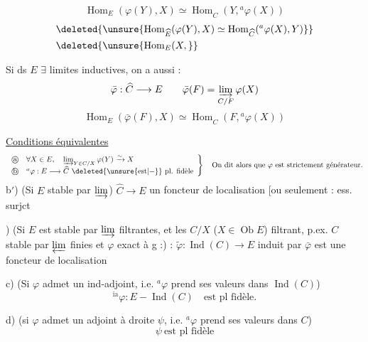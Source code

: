 \[
 \operatorname{Hom}_E(\varphi(Y),X)\simeq\operatorname{Hom}_{\widehat C}(Y,{}^a\varphi(X))
\]
\[
 \begin{aligned}
 &\deleted{\unsure{\operatorname{Hom}_{\widehat E}(\varphi(Y),X)\simeq\operatorname{Hom}_{\widehat C}({}^a\varphi(X),Y)}}\\
 &\deleted{\unsure{\operatorname{Hom}_E(X,}}
 \end{aligned}
\]

Si ds $E$ $\exists$  limites inductives, on a aussi :
\[
 \bar\varphi:\widehat C\longrightarrow E\qquad
 \bar\varphi(F)=\varinjlim_{C/F}\varphi(X)
\]
\[
 \operatorname{Hom}_{E}(\bar\varphi(F),X)\simeq\operatorname{Hom}_{\widehat C}(F,{}^a\varphi(X))
\]

\uline{Conditions équivalentes}
\[
 \left.\begin{array}{ll}
 \text{\textcircled{a}}&\forall X\in E,\quad\varinjlim_{Y\in C/X}\varphi(Y)\xrightarrow{\sim}X\\
 \text{\textcircled{b}}&{}^a\varphi:E\longrightarrow\widehat C\ \deleted{\unsure{\mathrm{est}|-}}\ \text{pl. fidèle}
 \end{array}\right\}\quad\text{On dit alors que $\varphi$ est strictement générateur.}
\]
b$'$) (Si $E$ stable par  $\varinjlim$) $\widehat C\to E$ un foncteur de localisation [ou seulement : ess. surjct

)  (Si $E$ est stable par  $\varinjlim$ filtrantes, et les $C/X$ ($X\in\operatorname{Ob} E$) filtrant, p.ex. $C$ stable par $\varprojlim$ finies et $\varphi$ exact à g :) : $\widetilde\varphi:\operatorname{Ind}(C)\to E$ induit par $\bar\varphi$ est une foncteur de localisation

c) (Si $\varphi$ admet un ind-adjoint, i.e. ${}^a\varphi$ prend ses valeurs dans $\operatorname{Ind}(C)$)
\[
 {}^{\mathrm{ia}}\varphi:E\mathbin{-}\operatorname{Ind}(C)\quad\text{est pl fidèle.}
\]

d) (si $\varphi$ admet un adjoint à droite $\psi$, i.e. ${}^a\varphi$ prend ses valeurs dans $C$)
\[
 \psi\ \text{est pl fidèle}
\]

